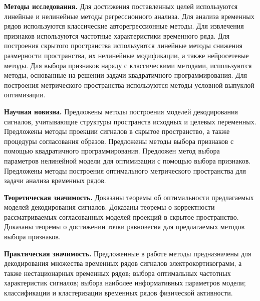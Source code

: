 \documentclass[11pt, a5paper]{dissert}
\begin{document}
\vspace{0.5cm}
\textbf{Методы исследования.}
Для достижения поставленных целей используются линейные и нелинейные методы регрессионного анализа.
Для анализа временных рядов используются классические авторегрессионные методы.
Для извлечения признаков используются частотные характеристики временного ряда.
Для построения скрытого пространства используются линейные методы снижения размерности пространства, их нелинейные модификации, а также нейросетевые методы.
Для выбора признаков наряду с классическими методами, используются методы, основанные на решении задачи квадратичного программирования.
Для построения метрического пространства используются методы условной выпуклой оптимизации.

\vspace{0.5cm}
\textbf{Научная новизна.}
Предложены методы построения моделей декодирования сигналов, учитывающие структуры пространств исходных и целевых переменных.
Предложены методы проекции сигналов в скрытое пространство, а также процедуры согласования образов.
Предложены методы выбора признаков с помощью квадратичного программирования.
Предложен метод выбора параметров нелинейной модели для оптимизации с помощью выбора признаков.
Предложены методы построения оптимального метрического пространства для задачи анализа временных рядов.

\vspace{0.5cm}
\textbf{Теоретическая значимость.}
Доказаны теоремы об оптимальности предлагаемых моделей декодирования сигналов.
Доказаны теоремы о корректности рассматриваемых согласованных моделей проекций в скрытое пространство.
Доказаны теоремы о достижении точки равновесия для предлагаемых методов выбора признаков. 

\vspace{0.5cm}
\textbf{Практическая значимость.}
Предложенные в работе методы предназначены для декодирования множества временных рядов сигналов электрокортикограмм, а также нестационарных временных рядов; выбора оптимальных частотных характеристик сигналов; выбора наиболее информативных параметров модели; классификации и кластеризации временных рядов физической активности.
\end{document}
